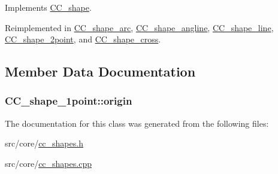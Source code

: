 Implements \hyperlink{a00037_a323c027fc21841c560b5759573b50f56}{C\-C\-\_\-shape}.



Reimplemented in \hyperlink{a00041_ac99e4b812a5eb489d29d324cd7dca7e5}{C\-C\-\_\-shape\-\_\-arc}, \hyperlink{a00040_a3aead16af5b691651d76d1d71138aae8}{C\-C\-\_\-shape\-\_\-angline}, \hyperlink{a00043_a8678d21e42e37bece16b3cac98241d98}{C\-C\-\_\-shape\-\_\-line}, \hyperlink{a00039_a5de0c111a1e2e01c7f2802333809b421}{C\-C\-\_\-shape\-\_\-2point}, and \hyperlink{a00042_a3326faef7625f5edfad2e5ba09927b6d}{C\-C\-\_\-shape\-\_\-cross}.



\subsection{Member Data Documentation}
\hypertarget{a00038_a3e7c4e0c903b4331b98351cf8402b0cd}{
\subsubsection[{origin}]{ C\-C\-\_\-shape\-\_\-1point\-::origin\hspace{0.3cm}{\ttfamily [protected]}}}\label{a00038_a3e7c4e0c903b4331b98351cf8402b0cd}


The documentation for this class was generated from the following files\-:\begin{DoxyCompactItemize}
\item 
src/core/\hyperlink{a00210}{cc\-\_\-shapes.\-h}\item 
src/core/\hyperlink{a00209}{cc\-\_\-shapes.\-cpp}\end{DoxyCompactItemize}
